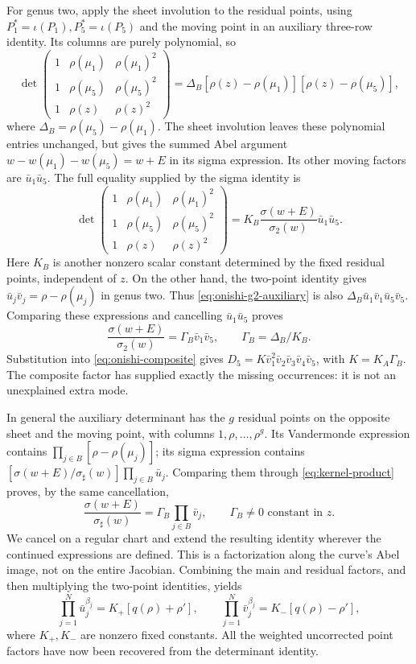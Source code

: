\documentclass[11pt]{article}
\begin{document}
For genus two, apply the sheet involution to the residual points, using $P_1^*=\iota(P_1),P_5^*=\iota(P_5)$ and the moving point in an auxiliary three-row identity. Its columns are purely polynomial, so
\begin{equation}\label{eq:onishi-g2-auxiliary}
\det\begin{pmatrix}
1&\rho(\mu_1)&\rho(\mu_1)^2\\
1&\rho(\mu_5)&\rho(\mu_5)^2\\
1&\rho(z)&\rho(z)^2
\end{pmatrix}
=\Delta_B[\rho(z)-\rho(\mu_1)][\rho(z)-\rho(\mu_5)],
\end{equation}
where $\Delta_B=\rho(\mu_5)-\rho(\mu_1)$. The sheet involution leaves these polynomial entries unchanged, but gives the summed Abel argument $w-w(\mu_1)-w(\mu_5)=w+E$ in its sigma expression. Its other moving factors are $\bar u_1\bar u_5$. The full equality supplied by the sigma identity is
\[
\det\begin{pmatrix}
1&\rho(\mu_1)&\rho(\mu_1)^2\\
1&\rho(\mu_5)&\rho(\mu_5)^2\\
1&\rho(z)&\rho(z)^2
\end{pmatrix}
=K_B\frac{\sigma(w+E)}{\sigma_2(w)}\bar u_1\bar u_5.
\]
Here $K_B$ is another nonzero scalar constant determined by the fixed residual points, independent of $z$.
On the other hand, the two-point identity gives $\bar u_j\bar v_j=\rho-\rho(\mu_j)$ in genus two. Thus \eqref{eq:onishi-g2-auxiliary} is also $\Delta_B\bar u_1\bar v_1\bar u_5\bar v_5$. Comparing these expressions and cancelling $\bar u_1\bar u_5$ proves
\[
\frac{\sigma(w+E)}{\sigma_2(w)}=\Gamma_B\bar v_1\bar v_5,
\qquad \Gamma_B=\Delta_B/K_B.
\]
Substitution into \eqref{eq:onishi-composite} gives $D_5=K\bar v_1^2\bar v_2\bar v_3\bar v_4\bar v_5$, with $K=K_A\Gamma_B$. The composite factor has supplied exactly the missing occurrences: it is not an unexplained extra mode.

In general the auxiliary determinant has the $g$ residual points on the opposite sheet and the moving point, with columns $1,\rho,\ldots,\rho^g$. Its Vandermonde expression contains $\prod_{j\in B}[\rho-\rho(\mu_j)]$; its sigma expression contains $[\sigma(w+E)/\sigma_\sharp(w)]\prod_{j\in B}\bar u_j$. Comparing them through \eqref{eq:kernel-product} proves, by the same cancellation,
\begin{equation}\label{eq:onishi-residual-split}
\frac{\sigma(w+E)}{\sigma_\sharp(w)}
 =\Gamma_B\prod_{j\in B}\bar v_j,
\qquad \Gamma_B\ne0\text{ constant in }z.
\end{equation}
We cancel on a regular chart and extend the resulting identity wherever the continued expressions are defined. This is a factorization along the curve's Abel image, not on the entire Jacobian. Combining the main and residual factors, and then multiplying the two-point identities, yields
\begin{equation}\label{eq:onishi-raw-products}
\prod_{j=1}^{N}\bar u_j^{\beta_j}=K_+[q(\rho)+\rho'],\qquad
\prod_{j=1}^{N}\bar v_j^{\beta_j}=K_-[q(\rho)-\rho'],
\end{equation}
where $K_+,K_-$ are nonzero fixed constants. All the weighted uncorrected point factors have now been recovered from the determinant identity.
\end{document}
